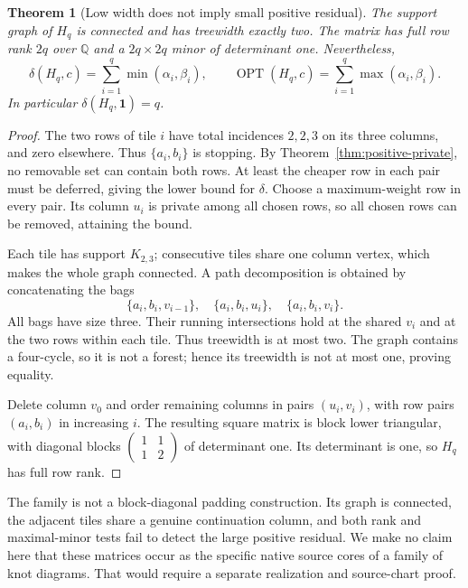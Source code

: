 \documentclass[11pt,a4paper]{article}
\newtheorem{theorem}{Theorem}[section]
\theoremstyle{definition}
\theoremstyle{remark}
\newcommand{\OPT}{\operatorname{OPT}}
\begin{document}
\begin{theorem}[Low width does not imply small positive residual]
\label{thm:barrier}
The support graph of $H_q$ is connected and has treewidth exactly two.
The matrix has full row rank $2q$ over $\mathbb Q$ and a $2q\times2q$
minor of determinant one. Nevertheless,
\begin{equation}
 \delta(H_q,c)=\sum_{i=1}^q\min(\alpha_i,\beta_i),\qquad
 \OPT(H_q,c)=\sum_{i=1}^q\max(\alpha_i,\beta_i).
 \label{eq:familyopt}
\end{equation}
In particular $\delta(H_q,\mathbf1)=q$.
\end{theorem}
\begin{proof}
The two rows of tile $i$ have total incidences $2,2,3$ on its three
columns, and zero elsewhere. Thus $\{a_i,b_i\}$ is stopping. By
Theorem~\ref{thm:positive-private}, no removable set can contain both rows.
At least the cheaper row in each pair must be deferred, giving the lower
bound for $\delta$. Choose a maximum-weight row in every pair. Its column
$u_i$ is private among all chosen rows, so all chosen rows can be removed,
attaining the bound.

Each tile has support $K_{2,3}$; consecutive tiles share one column
vertex, which makes the whole graph connected. A path decomposition is
obtained by concatenating the bags
\[
 \{a_i,b_i,v_{i-1}\},\quad
 \{a_i,b_i,u_i\},\quad
 \{a_i,b_i,v_i\}.
\]
All bags have size three. Their running intersections hold at the shared
$v_i$ and at the two rows within each tile. Thus treewidth is at most two.
The graph contains a four-cycle, so it is not a forest; hence its treewidth
is not at most one, proving equality.

Delete column $v_0$ and order remaining columns in pairs $(u_i,v_i)$,
with row pairs $(a_i,b_i)$ in increasing $i$. The resulting square matrix
is block lower triangular, with diagonal blocks
$\left(\begin{smallmatrix}1&1\\1&2\end{smallmatrix}\right)$ of determinant
one. Its determinant is one, so $H_q$ has full row rank.
\end{proof}

The family is not a block-diagonal padding construction. Its graph is
connected, the adjacent tiles share a genuine continuation column, and
both rank and maximal-minor tests fail to detect the large positive
residual. We make no claim here that these matrices occur as the specific
native source cores of a family of knot diagrams. That would require a
separate realization and source-chart proof.
\end{document}
